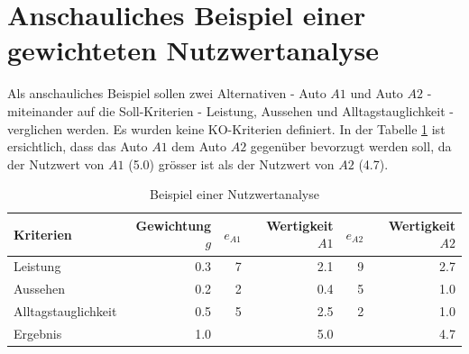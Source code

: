   \section{Anschauliches Beispiel einer gewichteten Nutzwertanalyse}
  
  Als anschauliches Beispiel sollen zwei Alternativen - Auto \(A1\) und Auto
  \(A2\) - miteinander auf die Soll-Kriterien - Leistung, Aussehen und
  Alltagstauglichkeit - verglichen werden. Es wurden keine KO-Kriterien
  definiert. In der Tabelle \ref{tab:beispielNwa} ist ersichtlich, dass das
  Auto \(A1\) dem Auto \(A2\) gegenüber bevorzugt werden soll, da der Nutzwert
  von \(A1\) (5.0) grösser ist als der Nutzwert von \(A2\) (4.7).
  \newline
  
  \begin{table}[h!]
    \sffamily 
    \begin{center}
      \begin{tabular}{lrrrrr}
        \toprule
        \textbf{Kriterien} & \textbf{Gewichtung \(g\)} & \textbf{\(e_{A1}\)} &
        \textbf{Wertigkeit \(A1\)} & \textbf{\(e_{A2}\)} & \textbf{Wertigkeit
        \(A2\)}\\
        \midrule
        Leistung            & 0.3 & 7 & 2.1 & 9 & 2.7 \\
        Aussehen            & 0.2 & 2 & 0.4 & 5 & 1.0 \\
        Alltagstauglichkeit & 0.5 & 5 & 2.5 & 2 & 1.0 \\
        \midrule
        \midrule
        Ergebnis            & 1.0 &   & 5.0 &   & 4.7 \\
        \bottomrule
      \end{tabular}
      \caption{Beispiel einer Nutzwertanalyse}
      \label{tab:beispielNwa}
    \end{center}
  \end{table}
  
